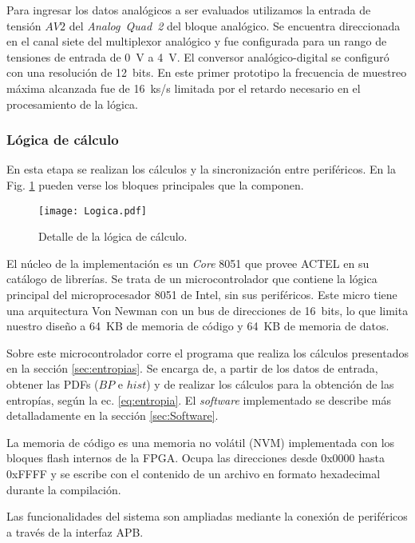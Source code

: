 Para ingresar los datos analógicos a ser evaluados utilizamos la entrada de tensión $AV2$ del \textit{Analog~Quad~2} del bloque analógico.
Se encuentra direccionada en el canal siete del multiplexor analógico y fue configurada para un rango de tensiones de entrada de 0~V a 4~V.
El conversor analógico-digital se configuró con una resolución de 12~bits.
En este primer prototipo la frecuencia de muestreo máxima alcanzada fue de 16~ks/s limitada por el retardo necesario en el procesamiento de la lógica.

\subsubsection{Lógica de cálculo}

En esta etapa se realizan los cálculos y la sincronización entre periféricos.
En la Fig. \ref{fig:logica} pueden verse los bloques principales que la componen.

\begin{figure}
	\centering
	\texttt{[image: Logica.pdf]}\\
	\caption{Detalle de la lógica de cálculo.}\label{fig:logica}
\end{figure}

El núcleo de la implementación es un \textit{Core} 8051 que provee ACTEL en su catálogo de librerías.
Se trata de un microcontrolador que contiene la lógica principal del microprocesador 8051 de Intel, sin sus periféricos.
Este micro tiene una arquitectura Von Newman con un bus de direcciones de 16~bits, lo que limita nuestro diseño a 64~KB de memoria de código y 64~KB de memoria de datos.

Sobre este microcontrolador corre el programa que realiza los cálculos presentados en la sección \ref{sec:entropias}.
Se encarga de, a partir de los datos de entrada, obtener las PDFs ($BP$ e $hist$) y de realizar los cálculos para la obtención de las entropías, según la ec. \ref{eq:entropia}.
El \textit{software} implementado se describe más detalladamente en la sección \ref{sec:Software}.

La memoria de código es una memoria no volátil (NVM) implementada con los bloques flash internos de la FPGA.
Ocupa las direcciones desde 0x0000 hasta 0xFFFF y se escribe con el contenido de un archivo en formato hexadecimal durante la compilación.

Las funcionalidades del sistema son ampliadas mediante la conexión de periféricos a través de la interfaz APB.

